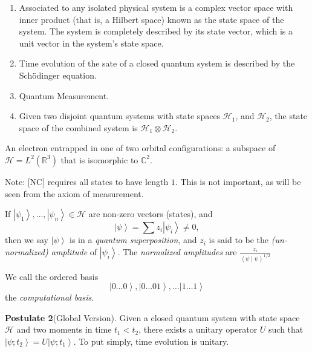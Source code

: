 
\begin{enumerate}
	\item Associated to any isolated physical system is a complex vector space with inner product (that is, a Hilbert space) known as the state space of the system. The system is completely described by its state vector, which is a unit vector in the system’s state space.
	\item Time evolution of the sate of a closed quantum system is described by the Sch\"odinger equation.
	\item Quantum Measurement.
	\item Given two disjoint quantum systems with state spaces $\mathscr{H}_1$, and $\mathscr{H}_2$, the state space of the combined system is $\mathscr{H}_1 \otimes  \mathscr{H}_2$.
		
\end{enumerate}

\begin{example}
	An electron entrapped in one of two orbital configurations: a subspace of $\mathscr{H} = L^2(\mathbb{R}^3)$ that is isomorphic to $\mathbb{C}^2$.
\end{example}

Note: [NC] requires all states to have length $1$. This is not important, as will be seen from the axiom of measurement. 

\begin{definition}
	\label{defn:QuantumSuperposition}
	If $\left| \psi_1 \right\rangle , \ldots, \left| \psi_n \right\rangle  \in \mathscr{H}$ are non-zero vectors (states), and 
	\[
		\left| \psi \right\rangle  = \sum z_i \left| \psi_i \right\rangle \neq 0
	,\] 
	then we say $\left| \psi \right\rangle $ is in a \textit{quantum superposition}, and $z_i$ is said to be the \textit{(un-normalized) amplitude} of $\left| \psi_i \right\rangle $. The \textit{normalized amplitudes} are $\frac{z_i}{\left\langle \psi \middle| \psi \right\rangle ^{1 / 2}}$
\end{definition}

We call the ordered basis
\[
	\left| 0 \ldots 0 \right\rangle , \left| 0 \ldots 0 1 \right\rangle , \ldots \left| 1 \ldots 1 \right\rangle
\] 
the \textit{computational basis}.

\textbf{Postulate 2}(Global Version). Given a closed quantum system with state space $\mathscr{H}$ and two moments in time $t_1 < t_2$, there exists a unitary operator $U$ such that $\left| \psi; t_2 \right\rangle  = U \left| \psi; t_1 \right\rangle $. To put simply, time evolution is unitary.

